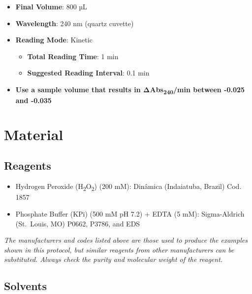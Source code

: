 \documentclass[
  9pt,
  american,
  a5paper,
  extrafontsizes,onecolumn,openright
  ]{memoir}
\providecommand{\tightlist}{%
  \setlength{\itemsep}{0pt}\setlength{\parskip}{0pt}}
\begin{document}
\begin{itemize}
\tightlist
\item
  \textbf{Final Volume}: 800 µL
\item
  \textbf{Wavelength}: 240 nm (quartz cuvette)
\item
  \textbf{Reading Mode}: Kinetic

  \begin{itemize}
  \tightlist
  \item
    \textbf{Total Reading Time}: 1 min
  \item
    \textbf{Suggested Reading Interval}: 0.1 min
  \end{itemize}
\item
  \textbf{Use a sample volume that results in ΔAbs\textsubscript{240}/min between -0.025 and -0.035}
\end{itemize}

\newpage

\section{Material}\label{cat_detailed_protocol}

\subsection{Reagents}\label{reagents}

\begin{itemize}
\tightlist
\item
  Hydrogen Peroxide (H\textsubscript{2}O\textsubscript{2}) (200 mM): Dinâmica (Indaiatuba, Brazil) Cod. 1857
\item
  Phosphate Buffer (KPi) (500 mM pH 7.2) + EDTA (5 mM): Sigma-Aldrich (St.~Louis, MO) P0662, P3786, and EDS
\end{itemize}

\begin{greybox}[frametitle = Note]
\emph{The manufacturers and codes listed above are those used to produce the examples shown in this protocol, but similar reagents from other manufacturers can be substituted. Always check the purity and molecular weight of the reagent.}

\end{greybox}

\subsection{Solvents}\label{solvents}
\end{document}

